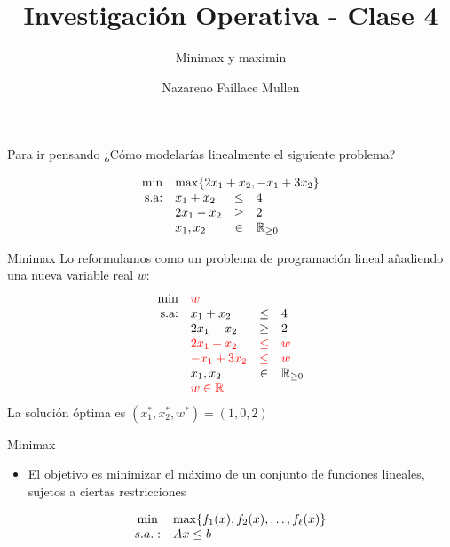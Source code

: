 \documentclass[10pt, aspectratio=169]{beamer}
\title{Investigación Operativa - Clase 4}
\subtitle{Minimax y maximin}
\date{}
\author{Nazareno Faillace Mullen}
\institute{Departamento de Matemática - FCEN - UBA}
\begin{document}
\maketitle


\begin{frame}{Para ir pensando}
    ¿Cómo modelarías linealmente el siguiente problema?

    \[
        \begin{array}{rlcl}
            \min & \multicolumn{3}{l}{\max\{2x_1+x_2, -x_1+3x_2\}}  \\
            \text{s.a:} & x_1 + x_2 & \leq & 4 \\
             &          2x_1-x_2 & \geq & 2 \\
             &          x_1, x_2 &\in & \mathbb{R}_{\geq 0}
        \end{array}
    \]
\end{frame}

\begin{frame}{Minimax}
    Lo reformulamos como un problema de programación lineal añadiendo una nueva variable real $w$:
    \[
        \begin{array}{rlcl}
            \min & \multicolumn{3}{l}{\color{red}w}  \\
            \text{s.a:} & x_1 + x_2 & \leq & 4 \\
             &          2x_1-x_2 & \geq & 2 \\
             &          \color{red}2x_1+x_2 & \color{red}\leq & \color{red}w \\
             &          \color{red}-x_1+3x_2 & \color{red}\leq & \color{red}w \\
             &          x_1, x_2 &\in & \mathbb{R}_{\geq 0} \\
             &          \color{red}w \in \color{red}\mathbb{R}
        \end{array}
    \]
    La solución óptima es $(x_1^\ast, x_2^\ast, w^\ast) = (1, 0, 2)$
\end{frame}

\begin{frame}{Minimax}
    \begin{itemize}
        \item El objetivo es minimizar el máximo de un conjunto de funciones lineales, sujetos a ciertas restricciones
    \end{itemize}
    \[\begin{array}{crl}
        \min & \multicolumn{2}{l}{\max\{f_1(x), f_2(x),\dots,f_\ell(x)\}}\\
        s.a.: & Ax\leq b \\
    \end{array}
    \]
\end{frame}
\end{document}
